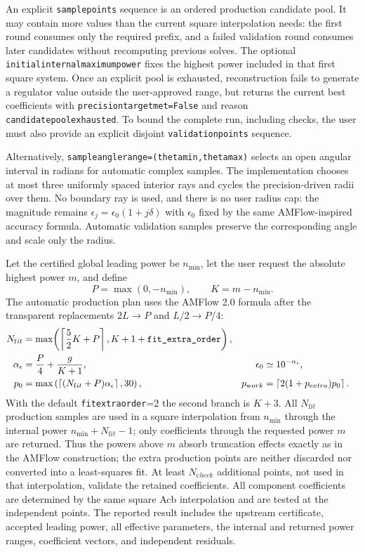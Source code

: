 \documentclass[11pt]{article}
\newcommand{\eps}{\epsilon}
\renewcommand{\_}{\origunderscore\allowbreak}
\begin{document}
An explicit \texttt{sample\_points} sequence is an ordered production candidate pool.  It may
contain more values than the current square interpolation needs: the first round consumes only
the required prefix, and a failed validation round consumes later candidates without recomputing
previous solves.  The optional \texttt{initial\_internal\_maximum\_power} fixes the highest power
included in that first square system.  Once an explicit pool is exhausted, reconstruction fails
to generate a regulator value outside the user-approved range, but returns the current best
coefficients with \texttt{precision\_target\_met=False} and reason
\texttt{candidate\_pool\_exhausted}.  To bound the complete run, including checks, the user must
also provide an explicit disjoint \texttt{validation\_points} sequence.

Alternatively, \texttt{sample\_angle\_range=(theta\_min,theta\_max)} selects an open angular
interval in radians for automatic complex samples.  The implementation chooses at most three
uniformly spaced interior rays and cycles the precision-driven radii over them.  No boundary ray
is used, and there is no user radius cap: the magnitude remains
$\epsilon_j=\epsilon_0(1+j\delta)$ with $\epsilon_0$ fixed by the same AMFlow-inspired accuracy
formula.  Automatic validation samples preserve the corresponding angle and scale only the radius.

Let the certified global leading power be $n_{\min}$, let the user request the absolute
highest power $m$, and define
\begin{equation}
  P=\max(0,-n_{\min}),\qquad K=m-n_{\min}.
\end{equation}
The automatic production plan uses the AMFlow 2.0 formula after the transparent replacements
$2L\to P$ and $L/2\to P/4$:
\begin{align}
 N_{\mathrm fit}&=
 \max\!\left(\left\lceil\frac52K+P\right\rceil,K+1+\texttt{fit\_extra\_order}\right),\\
 \alpha_\eps&=\frac P4+\frac{g}{K+1},
 &\eps_0&\simeq10^{-\alpha_\eps},\\
 p_0&=\max\left(\left\lceil(N_{\mathrm fit}+P)\alpha_\eps\right\rceil,30\right),
 &p_{\mathrm work}&=\left\lceil2(1+p_{\mathrm extra})p_0\right\rceil.
  \label{eq:ndes-series-reconstruction-default}
\end{align}
With the default \texttt{fit\_extra\_order}=2 the second branch is $K+3$.  All
$N_{\mathrm fit}$ production samples are used in a square interpolation from
$n_{\min}$ through the internal power
$n_{\min}+N_{\mathrm fit}-1$; only coefficients through the requested power $m$ are returned.
Thus the powers above $m$ absorb truncation effects exactly as in the AMFlow construction;
the extra production points are neither discarded nor converted into a least-squares fit.
At least $N_{\mathrm check}$ additional points, not used in that interpolation, validate the
retained coefficients.  All component coefficients are determined by the same square Acb
interpolation and are tested at the independent points.  The reported result includes the
upstream certificate, accepted leading power, all effective parameters, the internal and returned
power ranges, coefficient vectors, and independent residuals.
\end{document}
